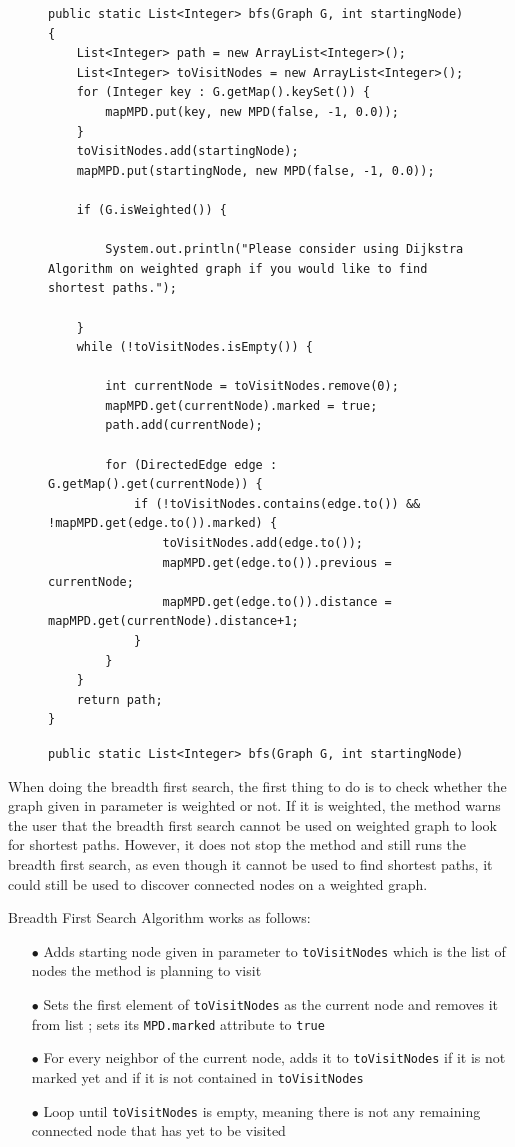 \documentclass{article}
\begin{document}
\begin{figure}[H]
\begin{verbatim}
public static List<Integer> bfs(Graph G, int startingNode) {
	List<Integer> path = new ArrayList<Integer>();
	List<Integer> toVisitNodes = new ArrayList<Integer>();
	for (Integer key : G.getMap().keySet()) {
		mapMPD.put(key, new MPD(false, -1, 0.0));
	}
	toVisitNodes.add(startingNode);
	mapMPD.put(startingNode, new MPD(false, -1, 0.0));
	
	if (G.isWeighted()) {
		
		System.out.println("Please consider using Dijkstra Algorithm on weighted graph if you would like to find shortest paths.");
		
	}	
	while (!toVisitNodes.isEmpty()) {

		int currentNode = toVisitNodes.remove(0);
		mapMPD.get(currentNode).marked = true;
		path.add(currentNode);
		
		for (DirectedEdge edge : G.getMap().get(currentNode)) {
			if (!toVisitNodes.contains(edge.to()) && !mapMPD.get(edge.to()).marked) {
				toVisitNodes.add(edge.to());
				mapMPD.get(edge.to()).previous = currentNode;
				mapMPD.get(edge.to()).distance = mapMPD.get(currentNode).distance+1;					
			}
		}
	}
	return path;
}
\end{verbatim}
\vspace*{-6mm}\caption{\texttt{public static List<Integer> bfs(Graph G, int startingNode)}}
\end{figure}

When doing the breadth first search, the first thing to do is to check whether the graph given in parameter is weighted or not.  If it is weighted, the method warns the user that the breadth first search cannot be used on weighted graph to look for shortest paths. However, it does not stop the method and still runs the breadth first search, as even though it cannot be used to find shortest paths, it could still be used to discover connected nodes on a weighted graph.

Breadth First Search Algorithm works as follows:
\begin{itemize}
\item[$\bullet$] Adds starting node given in parameter  to \texttt{toVisitNodes} which is the list of nodes the method is planning to visit
\item[$\bullet$] Sets the first element of \texttt{toVisitNodes} as the current node and removes it from list ; sets its \texttt{MPD.marked} attribute to \texttt{true}
\item[$\bullet$] For every neighbor of the current node, adds it to \texttt{toVisitNodes} if it is not marked yet and if it is not contained in \texttt{toVisitNodes}
\item[$\bullet$] Loop until \texttt{toVisitNodes} is empty, meaning there is not any remaining connected node that has yet to be visited
\end{itemize}
\end{document}
